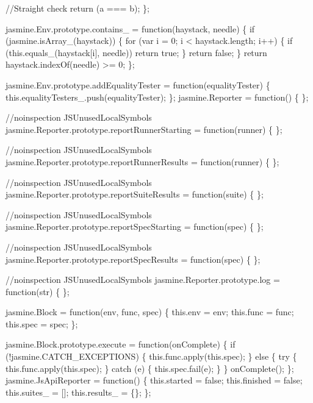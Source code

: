 \begin{DoxyCodeInclude}
  \textcolor{comment}{//Straight check}
  \textcolor{keywordflow}{return} (a === b);
\};

jasmine.Env.prototype.contains\_ = \textcolor{keyword}{function}(haystack, needle) \{
  \textcolor{keywordflow}{if} (jasmine.isArray\_(haystack)) \{
    \textcolor{keywordflow}{for} (var i = 0; i < haystack.length; i++) \{
      \textcolor{keywordflow}{if} (this.equals\_(haystack[i], needle)) \textcolor{keywordflow}{return} \textcolor{keyword}{true};
    \}
    \textcolor{keywordflow}{return} \textcolor{keyword}{false};
  \}
  \textcolor{keywordflow}{return} haystack.indexOf(needle) >= 0;
\};

jasmine.Env.prototype.addEqualityTester = \textcolor{keyword}{function}(equalityTester) \{
  this.equalityTesters\_.push(equalityTester);
\};
jasmine.Reporter = \textcolor{keyword}{function}() \{
\};

\textcolor{comment}{//noinspection JSUnusedLocalSymbols}
jasmine.Reporter.prototype.reportRunnerStarting = \textcolor{keyword}{function}(runner) \{
\};

\textcolor{comment}{//noinspection JSUnusedLocalSymbols}
jasmine.Reporter.prototype.reportRunnerResults = \textcolor{keyword}{function}(runner) \{
\};

\textcolor{comment}{//noinspection JSUnusedLocalSymbols}
jasmine.Reporter.prototype.reportSuiteResults = \textcolor{keyword}{function}(suite) \{
\};

\textcolor{comment}{//noinspection JSUnusedLocalSymbols}
jasmine.Reporter.prototype.reportSpecStarting = \textcolor{keyword}{function}(spec) \{
\};

\textcolor{comment}{//noinspection JSUnusedLocalSymbols}
jasmine.Reporter.prototype.reportSpecResults = \textcolor{keyword}{function}(spec) \{
\};

\textcolor{comment}{//noinspection JSUnusedLocalSymbols}
jasmine.Reporter.prototype.log = \textcolor{keyword}{function}(str) \{
\};

jasmine.Block = \textcolor{keyword}{function}(env, func, spec) \{
  this.env = env;
  this.func = func;
  this.spec = spec;
\};

jasmine.Block.prototype.execute = \textcolor{keyword}{function}(onComplete) \{
  \textcolor{keywordflow}{if} (!jasmine.CATCH\_EXCEPTIONS) \{
    this.func.apply(this.spec);
  \}
  \textcolor{keywordflow}{else} \{
    \textcolor{keywordflow}{try} \{
      this.func.apply(this.spec);
    \} \textcolor{keywordflow}{catch} (e) \{
      this.spec.fail(e);
    \}
  \}
  onComplete();
\};
jasmine.JsApiReporter = \textcolor{keyword}{function}() \{
  this.started = \textcolor{keyword}{false};
  this.finished = \textcolor{keyword}{false};
  this.suites\_ = [];
  this.results\_ = \{\};
\};


\end{DoxyCodeInclude}
